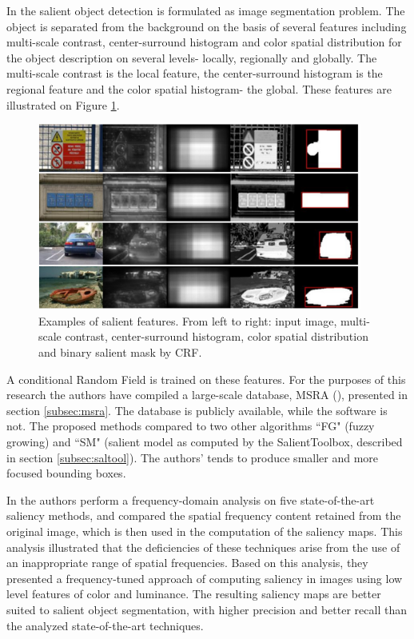 In \cite{LiuCVPR2007} the salient object detection is formulated as image segmentation problem. The object is separated from the background on the basis of several features including multi-scale contrast, center-surround histogram and color spatial distribution for the object description on several levels- locally, regionally and globally. The multi-scale contrast is the local feature, the center-surround histogram is the regional feature and the color spatial histogram- the global. These features are illustrated on Figure \ref{fig:sal_feat_liu07}.
\begin{figure}[H]
\begin{center}
\includegraphics[width=0.95\textwidth]{fig/SalientFeatures_Liu2007}
\end{center}
\caption{Examples of salient features. From left to right: input image, multi-scale contrast, center-surround histogram, color spatial distribution and binary salient mask by CRF.}
\label{fig:sal_feat_liu07}
\end{figure}
A conditional Random Field is trained on these features. 
For the purposes of this research the authors have compiled a large-scale database, MSRA (\cite{msra_db}), presented in section \ref{subsec:msra}. The database is publicly available, while the software is not. The proposed methods compared to two other algorithms ``FG" (fuzzy growing) and ``SM" (salient model as computed by the SalientToolbox, described in section \ref{subsec:saltool}). The authors' tends to produce smaller and more focused bounding boxes.

In \cite{LCAV-CONF-2009-012} the authors perform a frequency-domain analysis on five state-of-the-art saliency methods, and compared the spatial frequency
content retained from the original image, which is then used in the computation of the saliency maps. This analysis illustrated that the deficiencies of these techniques
arise from the use of an inappropriate range of spatial frequencies. Based on this analysis, they presented a frequency-tuned
approach of computing saliency in images using low level features of color and luminance. The resulting saliency maps are better suited to salient object segmentation, with higher precision and better recall than the analyzed state-of-the-art techniques.

